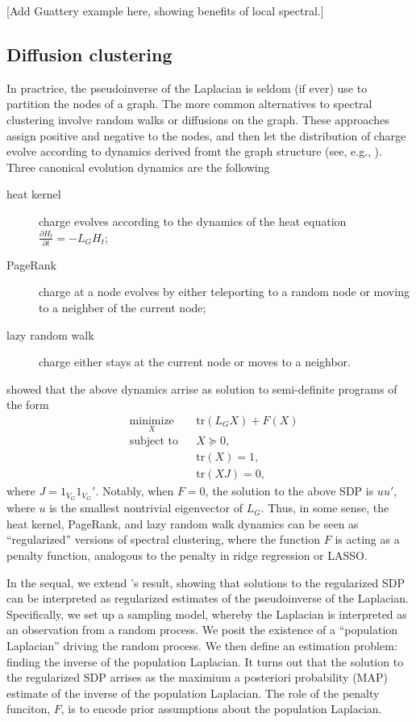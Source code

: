 \documentclass{article}
\begin{document}
[Add Guattery example here, showing benefits of local spectral.]


\subsection{Diffusion clustering}

In practrice, the pseudoinverse of the Laplacian is seldom (if ever)
use to partition the nodes of a graph.  The more common alternatives
to spectral clustering involve random walks or diffusions on the
graph.  These approaches assign positive and negative to the nodes,
and then let the distribution of charge evolve according to dynamics
derived fromt the graph structure (see, e.g., \citet{andersen2006local}).
Three canonical evolution dynamics are the following
\begin{description}
  \item[heat kernel]
    charge evolves according to the dynamics of the heat equation
    $\frac{\partial H_t}{\partial t} = - L_G H_t$;
  \item[PageRank]
    charge at a node evolves by either teleporting to a random node or moving
    to a neighber of the current node;
  \item[lazy random walk]
    charge either stays at the current node or moves to a neighbor.
\end{description}
\citet{mahoney2010implementing} showed that the above dynamics arrise
as solution to semi-definite programs of the form
\[
\begin{aligned}
  & \underset{X}{\text{minimize}}
  & & \mathrm{tr}(L_G X) + F(X) \\
  & \text{subject to}
  & & X \succeq 0, \\
  & & & \mathrm{tr}(X) = 1, \\
  & & & \mathrm{tr}(X J) = 0,
\end{aligned}
\]
where $J = 1_{V_G} 1_{V_G}'$.  Notably, when $F = 0$, the solution
to the above SDP is $u u'$, where $u$ is the smallest nontrivial
eigenvector of $L_G$.  Thus, in some sense, the heat kernel, PageRank,
and lazy random walk dynamics can be seen as ``regularized'' versions
of spectral clustering, where the function $F$ is acting as a penalty
function, analogous to the penalty in ridge regression or LASSO.

In the sequal, we extend 's
result, showing that solutions to the regularized SDP can be
interpreted as regularized estimates of the pseudoinverse of the
Laplacian.  Specifically, we set up a sampling model, whereby the
Laplacian is interpreted as an observation from a random process.  We
posit the existence of a ``population Laplacian'' driving the random
process.  We then define an estimation problem: finding the inverse of
the population Laplacian.  It turns out that the solution to the
regularized SDP arrises as the maximium a posteriori probability (MAP)
estimate of the inverse of the population Laplacian.  The role of the
penalty funciton, $F$, is to encode prior assumptions about the
population Laplacian.
\end{document}
